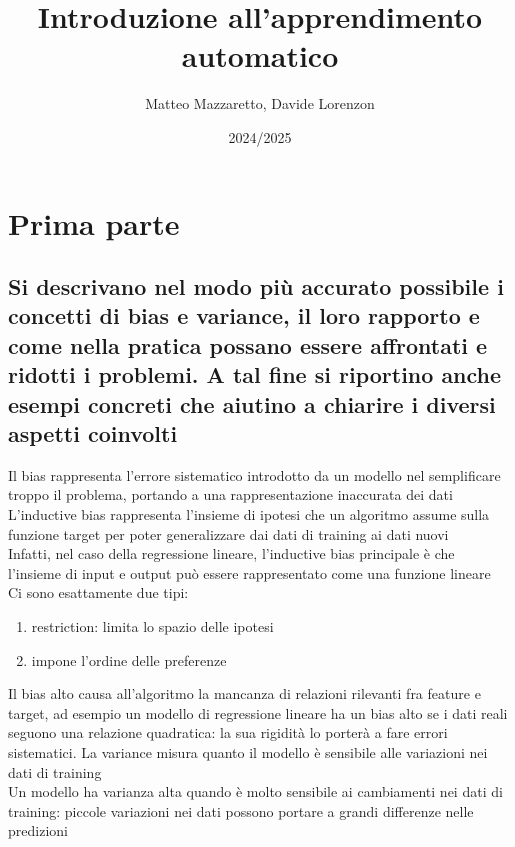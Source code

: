 \documentclass[10pt,oneside,a4paper]{article}
\title{Introduzione all'apprendimento automatico}
\author{Matteo Mazzaretto, Davide Lorenzon}
\date{2024/2025}
\begin{document}
\maketitle
\begin{center}
\renewcommand{\contentsname}{Indice}
\tableofcontents
\end{center}
\newpage
\setcounter{page}{1}
\section{Prima parte}
\subsection{Si descrivano nel modo più accurato possibile i concetti di bias e variance, il loro rapporto e come nella pratica possano essere affrontati e ridotti i problemi. A tal fine si riportino anche esempi concreti che aiutino a chiarire i diversi aspetti coinvolti}
Il bias rappresenta l'errore sistematico introdotto da un modello nel semplificare troppo il problema, portando a una rappresentazione inaccurata dei dati\\
L'inductive bias rappresenta l'insieme di ipotesi che un algoritmo assume sulla funzione target per poter generalizzare dai dati di training ai dati nuovi\\
Infatti, nel caso della regressione lineare, l'inductive bias principale è che l'insieme di input e output può essere rappresentato come una funzione lineare\\
Ci sono esattamente due tipi:
\begin{enumerate}
	\item restriction: limita lo spazio delle ipotesi
	\item impone l'ordine delle preferenze
\end{enumerate}
Il bias alto causa all'algoritmo la mancanza di relazioni rilevanti fra feature e target, ad esempio un modello di regressione lineare ha un bias alto se i dati reali seguono una relazione quadratica: la sua rigidità lo porterà a fare errori sistematici.
La variance misura quanto il modello è sensibile alle variazioni nei dati di training\\
Un modello ha varianza alta quando è molto sensibile ai cambiamenti nei dati di training: piccole variazioni nei dati possono portare a grandi differenze nelle predizioni\\
\end{document}
